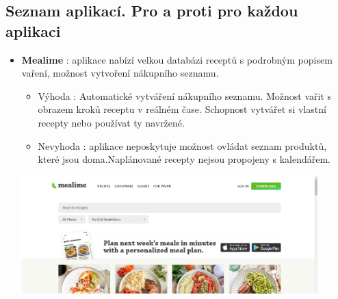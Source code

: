 \documentclass[a4paper,12pt]{article}
\begin{document}
\subsection*{Seznam aplikací. Pro a proti pro každou aplikaci}
\begin{itemize}
    \item \textbf{Mealime} : aplikace nabízí velkou databázi receptů s podrobným popisem vaření, možnost vytvoření nákupního seznamu.
    \begin{itemize}
        \item Výhoda :  Automatické vytváření nákupního seznamu. Možnost vařit s obrazem kroků receptu v reálném čase. Schopnost vytvářet si vlastní recepty nebo používat ty navržené.
        \item Nevyhoda : aplikace neposkytuje možnost ovládat seznam produktů, které jsou doma.Naplánované recepty nejsou propojeny s kalendářem.
    \end{itemize}
    \includegraphics[width=0.9\textwidth]{mealime.png}
    


\end{itemize}
\end{document}
